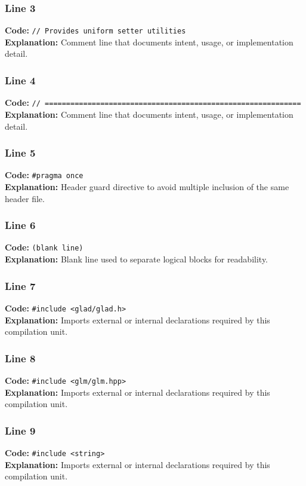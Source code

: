 \documentclass[11pt,a4paper]{article}
\begin{document}
\subsubsection*{Line 3}
\textbf{Code:} \verb|// Provides uniform setter utilities|\\
\textbf{Explanation:} Comment line that documents intent, usage, or implementation detail.

\subsubsection*{Line 4}
\textbf{Code:} \verb|// ============================================================|\\
\textbf{Explanation:} Comment line that documents intent, usage, or implementation detail.

\subsubsection*{Line 5}
\textbf{Code:} \verb|#pragma once|\\
\textbf{Explanation:} Header guard directive to avoid multiple inclusion of the same header file.

\subsubsection*{Line 6}
\textbf{Code:} \texttt{(blank line)}\\
\textbf{Explanation:} Blank line used to separate logical blocks for readability.

\subsubsection*{Line 7}
\textbf{Code:} \verb|#include <glad/glad.h>|\\
\textbf{Explanation:} Imports external or internal declarations required by this compilation unit.

\subsubsection*{Line 8}
\textbf{Code:} \verb|#include <glm/glm.hpp>|\\
\textbf{Explanation:} Imports external or internal declarations required by this compilation unit.

\subsubsection*{Line 9}
\textbf{Code:} \verb|#include <string>|\\
\textbf{Explanation:} Imports external or internal declarations required by this compilation unit.
\end{document}
